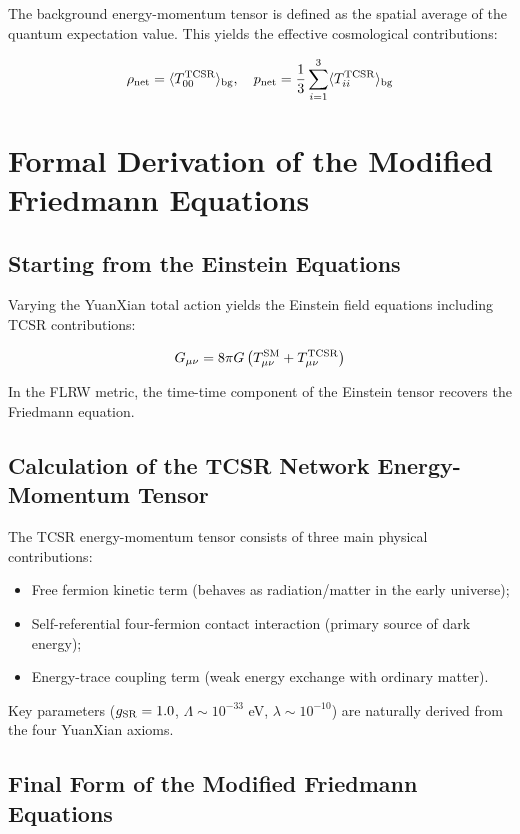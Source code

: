 \documentclass[12pt,a4paper]{article}
\begin{document}
The background energy-momentum tensor is defined as the spatial average of the quantum expectation value. This yields the effective cosmological contributions:

\[
\rho_{\rm net} = \langle T_{00}^{\rm TCSR} \rangle_{\rm bg}, \quad p_{\rm net} = \frac{1}{3} \sum_{i=1}^3 \langle T_{ii}^{\rm TCSR} \rangle_{\rm bg}
\]

\section{Formal Derivation of the Modified Friedmann Equations}

\subsection{Starting from the Einstein Equations}

Varying the YuanXian total action yields the Einstein field equations including TCSR contributions:

\[
G_{\mu\nu} = 8\pi G \left( T_{\mu\nu}^{\rm SM} + T_{\mu\nu}^{\rm TCSR} \right)
\]

In the FLRW metric, the time-time component of the Einstein tensor recovers the Friedmann equation.

\subsection{Calculation of the TCSR Network Energy-Momentum Tensor}

The TCSR energy-momentum tensor consists of three main physical contributions:
\begin{itemize}
    \item Free fermion kinetic term (behaves as radiation/matter in the early universe);
    \item Self-referential four-fermion contact interaction (primary source of dark energy);
    \item Energy-trace coupling term (weak energy exchange with ordinary matter).
\end{itemize}

Key parameters ($g_{\rm SR}=1.0$, $\Lambda \sim 10^{-33}$ eV, $\lambda \sim 10^{-10}$) are naturally derived from the four YuanXian axioms.

\subsection{Final Form of the Modified Friedmann Equations}
\end{document}
